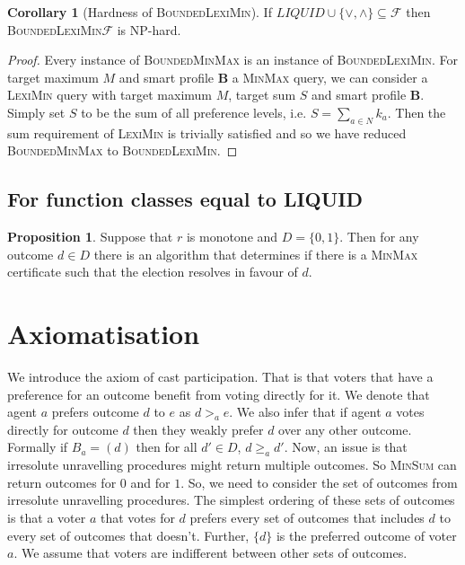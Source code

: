 \documentclass[11pt,a4paper, titlepage]{article}
\theoremstyle{definition}
\newtheorem{corollary}[theorem]{Corollary}
\newtheorem{proposition}[theorem]{Proposition}
\let\vec\mathbf
\begin{document}
\begin{corollary}[Hardness of \textsc{BoundedLexiMin}]
    If $ \mathit{LIQUID} \cup \{\lor, \land\} \subseteq \mathcal{F}$ then \textsc{BoundedLexiMin}$\mathcal{F}$ is NP-hard. 
\end{corollary}

\begin{proof}
    Every instance of \textsc{BoundedMinMax} is an instance of \textsc{BoundedLexiMin}. For target maximum $M$ and smart profile $\vec{B}$ a \textsc{MinMax} query, we can consider a \textsc{LexiMin} query with target maximum $M$, target sum $S$ and smart profile $\vec{B}$. Simply set $S$ to be the sum of all preference levels, i.e. $S = \sum_{a \in N} k_a$. Then the sum requirement of \textsc{LexiMin} is trivially satisfied and so we have reduced \textsc{BoundedMinMax} to \textsc{BoundedLexiMin}.
\end{proof}

\subsection{For function classes equal to LIQUID}

\begin{proposition}
    Suppose that $r$ is monotone and $D = \{0, 1\}$. Then for any outcome $d \in D$ there is an algorithm that determines if there is a \textsc{MinMax} certificate such that the election resolves in favour of $d$.
\end{proposition}
\newpage
\section{Axiomatisation}

We introduce the axiom of cast participation. That is that voters that have a preference for an outcome benefit from voting directly for it. We denote that agent $a$ prefers outcome $d$ to $e$ as $d >_a e$. We also infer that if agent $a$ votes directly for outcome $d$ then they weakly prefer $d$ over any other outcome. Formally if $B_a = (d)$ then for all $d' \in D$, $d \geq_a d'$.
Now, an issue is that irresolute unravelling procedures might return multiple outcomes. So \textsc{MinSum} can return outcomes for $0$ and for $1$.
So, we need to consider the set of outcomes from irresolute unravelling procedures. The simplest ordering of these sets of outcomes is that a voter $a$ that votes for $d$ prefers every set of outcomes that includes $d$ to every set of outcomes that doesn't. Further, $\{d\}$ is the preferred outcome of voter $a$. We assume that voters are indifferent between other sets of outcomes. 
\end{document}
